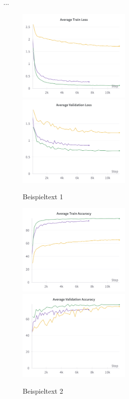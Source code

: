...

\begin{figure}
	\centering
	\includegraphics[width=0.5\textwidth]{figure_results_supcon-lin_avg-train-loss.png}%
	\includegraphics[width=0.5\textwidth]{figure_results_supcon-lin_avg-val-loss.png}
	\caption{Beispieltext 1}
	\label{fig:supcon-lin-loss}
\end{figure}
\begin{figure}
	\centering
	\includegraphics[width=0.5\textwidth]{figure_results_supcon-lin_avg-train-acc.png}%
	\includegraphics[width=0.5\textwidth]{figure_results_supcon-lin_avg-val-acc.png}
	\caption{Beispieltext 2}
	\label{fig:supcon-lin-acc}
\end{figure}
